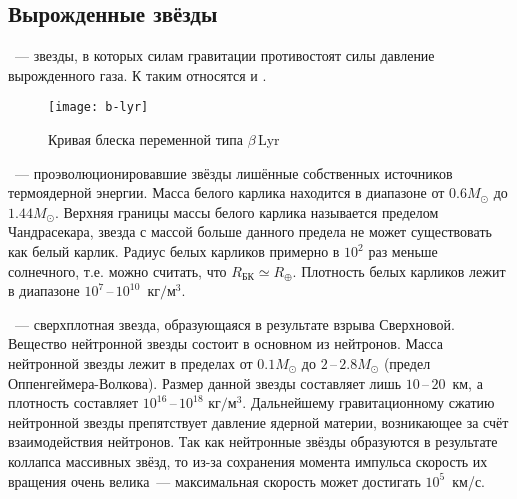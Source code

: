 \subsection{Вырожденные звёзды}
~--- звезды, в которых силам гравитации противостоят силы давление вырожденного газа. К таким относятся  и . 

\begin{figure}[!h]
	\centering
	\begin{minipage}[c]{0.49\tw}
 	\end{minipage}
 	\hfill
 	\begin{minipage}[c]{0.49\tw}
 		\centering
 		\texttt{[image: b-lyr]}	
 	\end{minipage}
 	\caption{Кривая блеска переменной типа $\beta$\,Lyr}
 	\label{pic:b-lyr}
 	\vspace{-.8pc}
\end{figure}
~--- проэволюционировавшие звёзды лишённые собственных источников термоядерной энергии. Масса белого карлика находится в диапазоне от $0.6M_{\odot}$ до $1.44 M_{\odot}$. Верхняя границы массы белого карлика называется пределом Чандрасекара, звезда с массой больше данного предела не может существовать как белый карлик. Радиус белых карликов примерно в $10^2$ раз меньше солнечного, т.е. можно считать, что $R_\text{БК} \simeq R_\oplus$. Плотность белых карликов лежит в диапазоне $10^7$\,--\,$10^{10}$~$\text{кг}/\text{м}^3$.

~--- сверхплотная звезда, образующаяся в результате взрыва Сверхновой. Вещество нейтронной звезды состоит в основном из нейтронов. Масса нейтронной звезды лежит в пределах от $0.1M_{\odot}$ до $2$\,--\,$2.8M_{\odot}$ (предел Оппенгеймера-Волкова). Размер данной звезды составляет лишь $10$\,--\,$20$~км, а плотность составляет $10^{16}$\,--\,$10^{18}$ $\text{кг}/\text{м}^3$.  Дальнейшему гравитационному сжатию нейтронной звезды препятствует давление ядерной материи, возникающее за счёт взаимодействия нейтронов. Так как нейтронные звёзды образуются в результате  коллапса массивных звёзд, то из-за сохранения момента импульса скорость их вращения очень велика~--- максимальная скорость может достигать $10^5$~км/с.